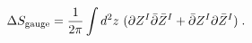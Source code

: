 \begin{equation}
\Delta S_{\rm gauge}={1\over 2\pi} \int d^2 z ~(\partial Z^I \bar \partial \bar Z^I+
\bar\partial Z^I \partial \bar Z^I )\;. 
\end{equation}


